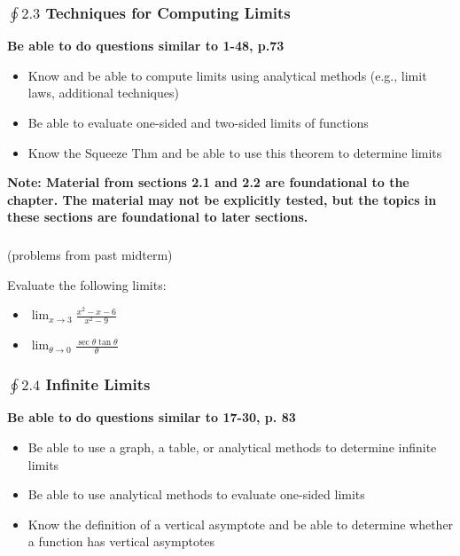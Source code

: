 \documentclass[14pt]{beamer}
\begin{document}
\begin{frame}
\frametitle{\small $\oint 2.3$ Techniques for Computing Limits}
\footnotesize
{\bf Be able to do questions similar to 1-48, p.73}
\begin{itemize}
\footnotesize
\item Know and be able to compute limits using analytical methods (e.g., limit laws, additional techniques)
\item Be able to evaluate one-sided and two-sided limits of functions
\item Know the Squeeze Thm and be able to use this theorem to determine limits
\end{itemize}
{\bf Note: Material from sections 2.1 and 2.2 are foundational to the chapter.  The material may not be explicitly tested, but the topics in these sections are foundational to later sections.}
\end{frame}

\begin{frame}
\frametitle{}
\small
(problems from past midterm)

\vspace{1pc}
\begin{exe} Evaluate the following limits:
\begin{itemize}
\item $\displaystyle\lim_{x\to 3}\frac{x^2-x-6}{x^2-9}$

\vspace{1pc}
\item $\displaystyle\lim_{\theta\to 0}\frac{\sec\theta\tan\theta}{\theta}$
\end{itemize}
\end{exe}
\end{frame}

\begin{frame}
\frametitle{\small $\oint 2.4$ Infinite Limits}
\small
{\bf Be able to do questions similar to 17-30, p. 83}

\begin{itemize}
\item Be able to use a graph, a table, or analytical methods to determine infinite limits
\item Be able to use analytical methods to evaluate one-sided limits
\item Know the definition of a vertical asymptote and be able to determine whether a function has vertical asymptotes
\end{itemize}
\end{frame}
\end{document}

